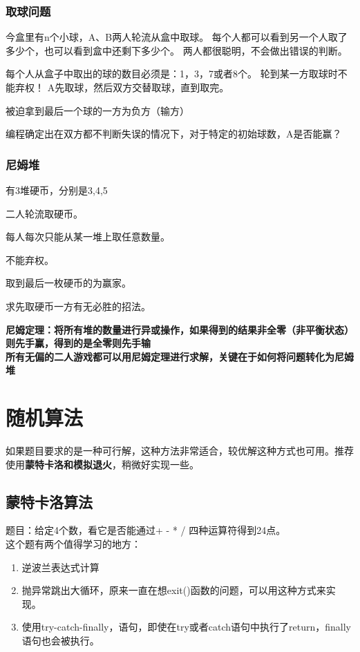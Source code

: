 \documentclass[a4paper]{article}
\begin{document}
	\subsubsection{取球问题}
	今盒里有n个小球，A、B两人轮流从盒中取球。
	每个人都可以看到另一个人取了多少个，也可以看到盒中还剩下多少个。
	两人都很聪明，不会做出错误的判断。
	
	每个人从盒子中取出的球的数目必须是：1，3，7或者8个。
	轮到某一方取球时不能弃权！
	A先取球，然后双方交替取球，直到取完。
	
	被迫拿到最后一个球的一方为负方（输方）
	
	编程确定出在双方都不判断失误的情况下，对于特定的初始球数，A是否能赢？
	
	
	\subsubsection{尼姆堆}
	有3堆硬币，分别是3,4,5
	
	二人轮流取硬币。
	
	每人每次只能从某一堆上取任意数量。
	
	不能弃权。
	
	取到最后一枚硬币的为赢家。
	
	求先取硬币一方有无必胜的招法。
	
	\textbf{尼姆定理：将所有堆的数量进行异或操作，如果得到的结果非全零（非平衡状态）则先手赢，得到的是全零则先手输}\\
	\textbf{所有无偏的二人游戏都可以用尼姆定理进行求解，关键在于如何将问题转化为尼姆堆}
	
	
	\section{随机算法}
	如果题目要求的是一种可行解，这种方法非常适合，较优解这种方式也可用。推荐使用\textbf{蒙特卡洛和模拟退火}，稍微好实现一些。
	\subsection{蒙特卡洛算法}
	题目：给定4个数，看它是否能通过+ - * / 四种运算符得到24点。\\
	这个题有两个值得学习的地方：
	\begin{enumerate}
		\item 逆波兰表达式计算
		\item 抛异常跳出大循环，原来一直在想exit()函数的问题，可以用这种方式来实现。
		\item 使用try-catch-finally，语句，即使在try或者catch语句中执行了return，finally语句也会被执行。
	\end{enumerate}
	
\end{document}
